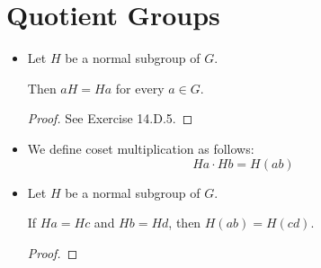 \documentclass[../notes.tex]{subfiles}
\begin{document}
\chapter{Quotient Groups}
\begin{itemize}
    \item Let $H$ be a normal subgroup of $G$.
    \begin{theorem}
        Then $aH=Ha$ for every $a\in G$.
        \begin{proof}
            See Exercise 14.D.5.
        \end{proof}
    \end{theorem}
    \item We define coset multiplication as follows:
    \begin{equation*}
        Ha\cdot Hb = H(ab)
    \end{equation*}
    \item Let $H$ be a normal subgroup of $G$.
    \begin{theorem}
        If $Ha=Hc$ and $Hb=Hd$, then $H(ab)=H(cd)$.
        \begin{proof}
            
        \end{proof}
    \end{theorem}
\end{itemize}
\end{document}
